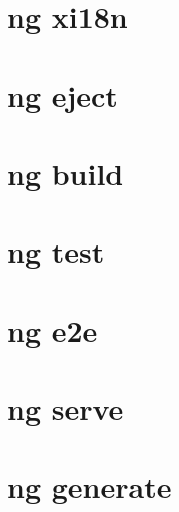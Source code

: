 \documentclass[8pt]{extarticle} %
\begin{document}
\begin{multicols}{3}
  \vspace{0.6ex}

\section*{ng xi18n}

\section*{ng eject}

\section*{ng build}

\section*{ng test}

\section*{ng e2e}

\section*{ng serve}

\section*{ng generate}

\end{multicols}
\end{document}
